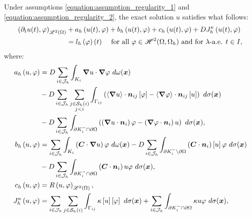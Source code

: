 Under assumptions \eqref{equation:assumption_regularity_1} and \eqref{equation:assumption_regularity_2}, the exact solution $u$ satisfies what follows:
\begin{align}
    \left( \partial_t u(t), \varphi \right)_{\mathscr{L}^{2}(\Omega)} &+ a_h \left( u(t), \varphi \right) + b_h \left( u(t), \varphi \right) + c_h \left( u(t), \varphi \right) + D J^{\kappa}_h \left( u(t), \varphi \right) \notag \\ 
    &= l_h \left( \varphi \right) (t) \quad \text{ for all } \varphi \in \mathscr{H}^{2}(\Omega, \Omega_h) \text{ and for } \lambda \text{-a.e. } t \in I,
\end{align}
where:
\begin{align}
    a_h \left( u, \varphi \right) &= \Diffusion \sum_{i \in \SpaceIndices} \int_{K_i} \Gradient u \cdot \Gradient \varphi ~ d \omega(\Vector{x}) \label{equation:cdr_ah} \\
    &- \Diffusion \sum_{i \in \SpaceIndices} \sum_{\substack{j \in \Neighbours{i} \\ j < i}} \int_{\Gamma_{ij}} \left( \left\langle \Gradient u \right\rangle \cdot \Vector{n}_{ij} \left[ \varphi \right] - \left\langle \Gradient \varphi \right\rangle \cdot \Vector{n}_{ij} \left[ u \right] \right) ~ d \sigma(\Vector{x}) \notag \\
    &- \Diffusion \sum_{i \in \SpaceIndices} \int_{\partial K_i^- \cap \partial \Omega} \left( \left( \Gradient u \cdot \Vector{n}_i \right) \varphi - \left( \Gradient \varphi \cdot \Vector{n}_i \right) u \right) ~ d \sigma(\Vector{x}), \notag \\
    b_h \left( u, \varphi \right) &= \sum_{i \in \SpaceIndices} \int_{K_i} \left( \Convection \cdot \Gradient u \right) \varphi ~ d \omega(\Vector{x}) \label{equation:cdr_bh} - \Diffusion \sum_{i \in \SpaceIndices} \int_{\partial K_i^- \setminus \partial \Omega} \left( \Convection \cdot \Vector{n}_i \right) \left[ u \right] \varphi ~ d \sigma(\Vector{x}) \\
    &- \Diffusion \sum_{i \in \SpaceIndices} \int_{\partial K_i^- \cap \partial \Omega} \left( \Convection \cdot \Vector{n}_i \right) u \varphi ~ d \sigma(\Vector{x}), \notag \\
    c_h \left( u, \varphi \right) &= \Reaction \left( u, \varphi \right)_{\SpaceLp{2}(\Omega)}, \label{equation:cdr_ch} \\
    J^{\kappa}_h \left( u, \varphi \right) &= \sum_{i \in \SpaceIndices} \sum_{j \in \Neighbours{i}} \int_{\Gamma_{ij}} \kappa \left[ u \right] \left[ \varphi \right] ~ d \sigma(\Vector{x}) + \sum_{i \in \SpaceIndices} \int_{\partial K_i^- \cap \partial \Omega} \kappa u \varphi ~ d \sigma(\Vector{x}), \label{equation:cdr_jh} \\

\end{align}
